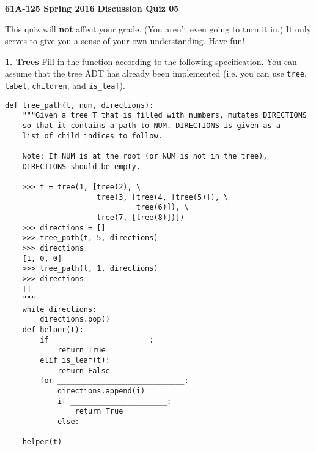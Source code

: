 \documentclass[11pt]{article}
\begin{document}
\textbf{61A-125 Spring 2016}\newline
\textbf{Discussion Quiz 05}\newline

This quiz will \textbf{not} affect your grade. (You aren't even going to turn it in.)\newline
It only serves to give you a sense of your own understanding. Have fun!\newline

\textbf{1. Trees}\newline
Fill in the function according to the following specification. You can assume that the tree ADT has already been implemented (i.e. you can use \lstinline{tree}, \lstinline{label}, \lstinline{children}, and \lstinline{is_leaf}).

\begin{lstlisting}
def tree_path(t, num, directions):
    """Given a tree T that is filled with numbers, mutates DIRECTIONS
    so that it contains a path to NUM. DIRECTIONS is given as a
    list of child indices to follow.
    
    Note: If NUM is at the root (or NUM is not in the tree), 
    DIRECTIONS should be empty.
    
    >>> t = tree(1, [tree(2), \
                     tree(3, [tree(4, [tree(5)]), \
                              tree(6)]), \
                     tree(7, [tree(8)])])
    >>> directions = []
    >>> tree_path(t, 5, directions)
    >>> directions
    [1, 0, 0]
    >>> tree_path(t, 1, directions)
    >>> directions
    []
    """
    while directions:
        directions.pop()
    def helper(t):
        if ______________________:
            return True
        elif is_leaf(t):
            return False
        for _____________________________:
            directions.append(i)
            if ______________________:
                return True
            else:
                ______________________
    helper(t)
\end{lstlisting}
\end{document}
